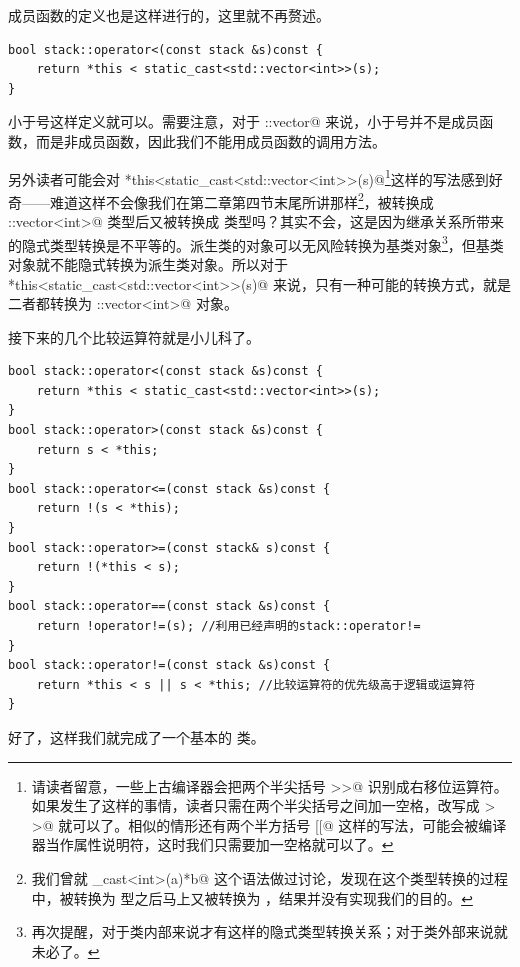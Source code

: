 \lstinline@swap@ 成员函数的定义也是这样进行的，这里就不再赘述。\par
\begin{lstlisting}
bool stack::operator<(const stack &s)const {
    return *this < static_cast<std::vector<int>>(s);
}
\end{lstlisting}
小于号这样定义就可以。需要注意，对于 \lstinline@std::vector@ 来说，小于号并不是成员函数，而是非成员函数，因此我们不能用成员函数的调用方法。\par
另外读者可能会对 \lstinline@*this<static_cast<std::vector<int>>(s)@\footnote{请读者留意，一些上古编译器会把两个半尖括号 \lstinline@>>@ 识别成右移位运算符。如果发生了这样的事情，读者只需在两个半尖括号之间加一空格，改写成 \lstinline@> >@ 就可以了。相似的情形还有两个半方括号 \lstinline@[[@ 这样的写法，可能会被编译器当作属性说明符，这时我们只需要加一空格就可以了。}这样的写法感到好奇——难道这样不会像我们在第二章第四节末尾所讲那样\footnote{我们曾就 \lstinline@static_cast<int>(a)*b@ 这个语法做过讨论，发现在这个类型转换的过程中，\lstinline@a@ 被转换为 \lstinline@int@ 型之后马上又被转换为 \lstinline@double@，结果并没有实现我们的目的。}，\lstinline@s@ 被转换成 \lstinline@std::vector<int>@ 类型后又被转换成 \lstinline@stack@ 类型吗？其实不会，这是因为继承关系所带来的隐式类型转换是不平等的。派生类的对象可以无风险转换为基类对象\footnote{再次提醒，对于类内部来说才有这样的隐式类型转换关系；对于类外部来说就未必了。}，但基类对象就不能隐式转换为派生类对象。所以对于\newline \lstinline@*this<static_cast<std::vector<int>>(s)@ 来说，只有一种可能的转换方式，就是二者都转换为 \lstinline@std::vector<int>@ 对象。\par
接下来的几个比较运算符就是小儿科了。
\begin{lstlisting}
bool stack::operator<(const stack &s)const {
    return *this < static_cast<std::vector<int>>(s);
}
bool stack::operator>(const stack &s)const {
    return s < *this;
}
bool stack::operator<=(const stack &s)const {
    return !(s < *this);
}
bool stack::operator>=(const stack& s)const {
    return !(*this < s);
}
bool stack::operator==(const stack &s)const {
    return !operator!=(s); //利用已经声明的stack::operator!=
}
bool stack::operator!=(const stack &s)const {
    return *this < s || s < *this; //比较运算符的优先级高于逻辑或运算符
}
\end{lstlisting}
好了，这样我们就完成了一个基本的 \lstinline@stack@ 类。\par
